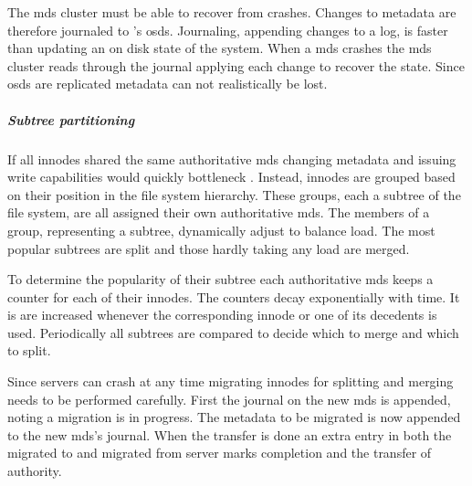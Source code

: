 The \ac{mds} cluster must be able to recover from crashes. Changes to metadata are therefore journaled to \ceph{}'s \acfp{osd}. Journaling, appending changes to a log, is faster than updating an on disk state of the system. When a \ac{mds} crashes the \ac{mds} cluster reads through the journal applying each change to recover the state. Since \acp{osd} are replicated metadata can not realistically be lost.
%
\subparagraph{Subtree partitioning} \label{sec:subtree}
If all innodes shared the same authoritative \ac{mds} changing metadata and issuing write capabilities would quickly bottleneck \ceph{}. Instead, innodes are grouped based on their position in the file system hierarchy. These groups, each a subtree of the file system, are all assigned their own authoritative \ac{mds}. The members of a group, representing a subtree, dynamically adjust to balance load. The most popular subtrees are split and those hardly taking any load are merged.

To determine the popularity of their subtree each authoritative \ac{mds} keeps a counter for each of their innodes. The counters decay exponentially with time. It is are increased whenever the corresponding innode or one of its decedents is used. Periodically all subtrees are compared to decide which to merge and which to split.

Since servers can crash at any time migrating innodes for splitting and merging needs to be performed carefully. First the journal on the new \ac{mds} is appended, noting a migration is in progress. The metadata to be migrated is now appended to the new \ac{mds}'s journal. When the transfer is done an extra entry in both the migrated to and migrated from server marks completion and the transfer of authority. 
